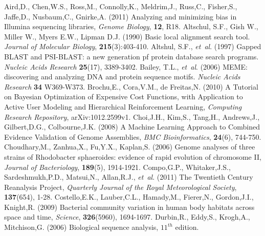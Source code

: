 
\begin{thebibliography}{}


 Aird,D., Chen,W.S., Ross,M., Connolly,K., Meldrim,J., Russ,C., Fisher,S., Jaffe,D., Nusbaum,C., Gnirke,A. (2011) Analyzing and minimizing bias in Illumina sequencing libraries, {\it Genome Biology}, {\bf 12}, R18.
    Altschul, S.F., Gish W., Miller W., Myers E.W., Lipman D.J. (1990) Basic local alignment search tool. \textit{Journal of Molecular Biology}, \textbf{215}(3):403-410.
Altshul, S.F., \textit{et~al}. (1997) Gapped BLAST and PSI-BLAST: a new generation pf protein database search programs. \textit{Nucleic Acids Research} \textbf{25}(17), 3389-3402.
Bailey, T.L., \textit{et~al}. (2006) MEME: discovering and analyzing DNA and protein sequence motifs. \textit{Nucleic Acids Research} \textbf{34} W369-W373.
 Brochu,E., Cora,V.M., de Freitas,N. (2010) A Tutorial on Bayesian Optimization of Expensive Cost Functions, with Application to Active User Modeling and Hierarchical Reinforcement Learning, {\it Computing Research Repository}, arXiv:1012.2599v1.
 Choi,J.H., Kim,S., Tang,H., Andrews,J., Gilbert,D.G., Colbourne,J.K. (2008) A Machine Learning Approach to Combined Evidence Validation of Genome Assemblies, {\it BMC Bioinformatics}, {\bf 24}(6), 744-750.
 Choudhary,M., Zanhua,X., Fu,Y.X., Kaplan,S. (2006) Genome analyses of three strains of Rhodobacter sphaeroides: evidence of rapid evolution of chromosome II, {\it Journal of Bacteriology}, {\bf 189}(5), 1914-1921.
 Compo,G.P., Whitaker,J.S., Sardeshmukh,P.D., Matsui,N., Allan,R.J., {\it et~al}. (2011) The Twentieth Century Reanalysis Project, {\it Quarterly Journal of the Royal Meteorological Society}, {\bf 137}(654), 1-28.
 Costello,E.K., Lauber,C.L., Hamady,M., Fierer,N., Gordon,J.I., Knight,R. (2009) Bacterial community variation in human body habitats across space and time, {\it Science}, {\bf 326}(5960), 1694-1697.
    Durbin,R., Eddy,S., Krogh,A., Mitchison,G. (2006) Biological sequence analysis, $11^{th}$ edition.

\end{thebibliography}
